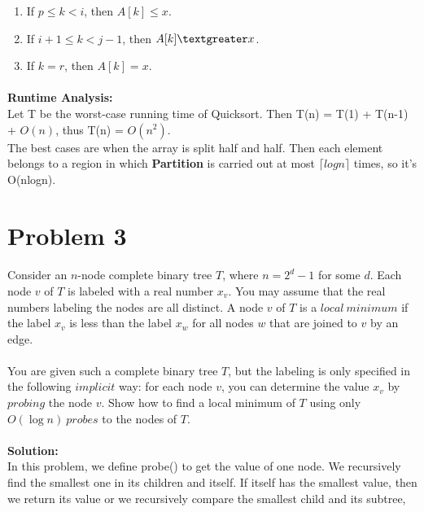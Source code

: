 \documentclass[11pt]{article}
\begin{document}
\begin{CJK*}{UTF8}{gkai}
\begin{enumerate}[ 1]
    \item  If $p \leq k <i$, then $A[k] \leq x$.

    \item  If $i+1 \leq k <j-1$, then $A[k] \textgreater x$.
    \item  If $k = r$, then $A[k]=x$.
\end{enumerate}


\paragraph{}\textbf{Runtime Analysis:} \\
Let T be the worst-case running time of Quicksort. Then T(n) = T(1) + T(n-1) + $O(n)$, thus T(n) = $O(n^2)$.\\
The best cases are when the array is split half and half. Then each element belongs to a region in which \textbf{Partition} is carried out at most $\lceil log{n} \rceil$ times, so it's O(n{log{n)}}.


\section{Problem 3}

\paragraph{}Consider an $n$-node complete binary tree $T$, where $n=2^d-1$ for some $d$. Each node $v$ of $T$ is labeled with a real number $x_v$. You may assume that the real numbers labeling the nodes are all distinct. A node $v$ of $T$ is a $local\ minimum$ if the label $x_v$ is less than the label $x_w$ for all nodes $w$ that are joined to $v$ by an edge.

\paragraph{}You are given such a complete binary tree $T$, but the labeling is only specified in the following $implicit$ way: for each node $v$, you can determine the value $x_v$ by $probing$ the node $v$. Show how to find a local minimum of $T$ using only $O(\log n)\ probes$ to the nodes of $T$.


    \paragraph{}\textbf{Solution:}\\
    In this problem, we define probe() to get the value of one node. We recursively find the smallest one in its children and itself. If itself has the smallest value, then we return its value or we recursively compare the smallest child and its subtree,



\end{CJK*}
\end{document}
